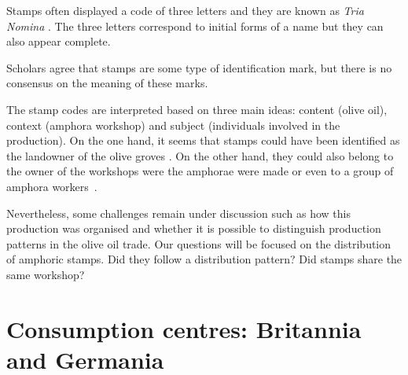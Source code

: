 \documentclass[review]{elsarticle}
\begin{document}
Stamps often displayed a code of three letters and they are known as \textit{Tria Nomina} \citep{berni_millet_amphora_1996}. The three letters correspond to initial forms of a name but they can also appear complete. 

Scholars agree that stamps are some type of identification mark, but there is no consensus on the meaning of these marks\citep{rodriguez_baetican_1998}. 


The stamp codes are interpreted based on three main ideas: content (olive oil), context (amphora workshop) and subject (individuals involved in the production). On the one hand, it seems that stamps could have been identified as the landowner of the olive groves \citep{rodriguez_economioleicola_1977}. On the other hand, they could also belong to the owner of the workshops were the amphorae were made or even to a group of amphora workers~\citep{berni_millet_epigrafianforica_2008}. 

Nevertheless, some challenges remain under discussion such as how this production was organised and whether it is possible to distinguish production patterns in the olive oil trade. Our questions will be focused on the distribution of amphoric stamps. Did they follow a distribution pattern? Did stamps share the same workshop? 



\section{Consumption centres: Britannia and Germania}
\end{document}
